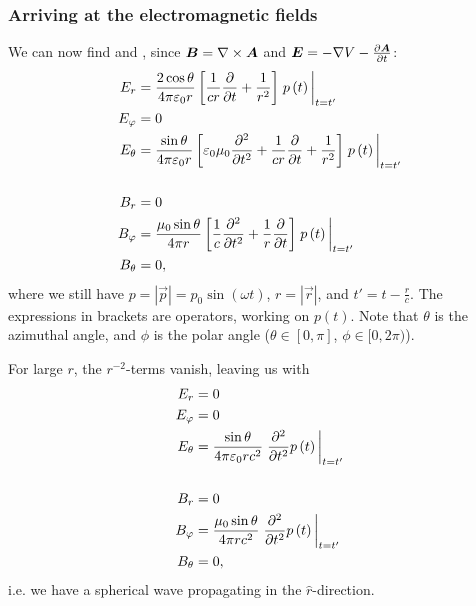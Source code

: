     \subsubsection*{Arriving at the electromagnetic fields}
        We can now find \B{} and \E, since $\bm{B} = \nabla\times\bm{A}$ and $\bm{E} = -\nabla V - \frac{\partial\bm{A}}{\partial t}$:
        \begin{align*}
            E_r &= \frac{2\cos\theta}{4\pi\e r}\left[\frac{1}{cr}\frac{\partial}{\partial t} + \frac{1}{r^2}\right]
                    \eval{p\left(t\right)}_{t=t'}\\
            E_\phi &= 0 \\
            E_\theta &= \frac{\sin\theta}{4\pi\e r}\left[\e\mu_0\frac{\partial^2}{\partial t^2} 
                    + \frac{1}{cr}\frac{\partial}{\partial t} + \frac{1}{r^2}\right]
                    \eval{p\left(t\right)}_{t=t'}\\
            &\\
            B_r &= 0 \\
            B_\phi &= \frac{\mu_0 \sin\theta}{4\pi r}\left[\frac{1}{c}\frac{\partial^2}{\partial t^2} + \frac{1}{r}\frac{\partial}{\partial t}\right]
                \eval{p\left(t\right)}_{t=t'}\\
            B_\theta &= 0,
        \end{align*}
        where we still have $p = |\vec{p}| = p_0\sin\left(\omega t\right)$, $r = |\vec{r}|$, and $t' = t - \frac{{r}}{c}$. 
        The expressions in brackets are operators, working on $p(t)$. Note that $\theta$ is the azimuthal angle, and $\phi$ is the polar angle
        ($\theta \in [0, \pi]$, $\phi \in [0, 2\pi)$).

        For large $r$, the $r^{-2}$-terms vanish, leaving us with 
        \begin{align*}
            E_r &= 0\\
            E_\phi &= 0 \\
            E_\theta &= \frac{\sin\theta}{4\pi\e r c^2}\eval{\frac{\partial^2}{\partial t^2} p\left(t\right)}_{t=t'}\\
            &\\
            B_r &= 0 \\
            B_\phi &= \frac{\mu_0 \sin\theta}{4\pi r c^2}\eval{\frac{\partial^2}{\partial t^2} p\left(t\right)}_{t=t'}\\
            B_\theta &= 0,
        \end{align*}
        i.e. we have a spherical wave propagating in the $\hat{r}$-direction. 

